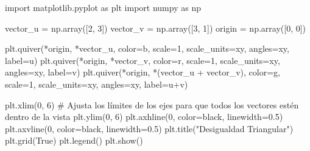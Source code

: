 \documentclass[
  letterpaper,
  DIV=11,
  numbers=noendperiod]{scrartcl}
\newenvironment{Shaded}{\begin{snugshade}}{\end{snugshade}}
\newcommand{\CommentTok}[1]{\textcolor[rgb]{0.37,0.37,0.37}{#1}}
\newcommand{\DecValTok}[1]{\textcolor[rgb]{0.68,0.00,0.00}{#1}}
\newcommand{\FloatTok}[1]{\textcolor[rgb]{0.68,0.00,0.00}{#1}}
\newcommand{\ImportTok}[1]{\textcolor[rgb]{0.00,0.46,0.62}{#1}}
\newcommand{\NormalTok}[1]{\textcolor[rgb]{0.00,0.23,0.31}{#1}}
\newcommand{\OperatorTok}[1]{\textcolor[rgb]{0.37,0.37,0.37}{#1}}
\newcommand{\StringTok}[1]{\textcolor[rgb]{0.13,0.47,0.30}{#1}}
\newcommand{\VariableTok}[1]{\textcolor[rgb]{0.07,0.07,0.07}{#1}}
\begin{document}
\begin{Shaded}
\begin{Highlighting}[]
\ImportTok{import}\NormalTok{ matplotlib.pyplot }\ImportTok{as}\NormalTok{ plt}
\ImportTok{import}\NormalTok{ numpy }\ImportTok{as}\NormalTok{ np}

\NormalTok{vector\_u }\OperatorTok{=}\NormalTok{ np.array([}\DecValTok{2}\NormalTok{, }\DecValTok{3}\NormalTok{])}
\NormalTok{vector\_v }\OperatorTok{=}\NormalTok{ np.array([}\DecValTok{3}\NormalTok{, }\DecValTok{1}\NormalTok{])}
\NormalTok{origin }\OperatorTok{=}\NormalTok{ np.array([}\DecValTok{0}\NormalTok{, }\DecValTok{0}\NormalTok{])}

\NormalTok{plt.quiver(}\OperatorTok{*}\NormalTok{origin, }\OperatorTok{*}\NormalTok{vector\_u, color}\OperatorTok{=}\StringTok{\textquotesingle{}b\textquotesingle{}}\NormalTok{, scale}\OperatorTok{=}\DecValTok{1}\NormalTok{, scale\_units}\OperatorTok{=}\StringTok{\textquotesingle{}xy\textquotesingle{}}\NormalTok{, angles}\OperatorTok{=}\StringTok{\textquotesingle{}xy\textquotesingle{}}\NormalTok{, label}\OperatorTok{=}\StringTok{\textquotesingle{}u\textquotesingle{}}\NormalTok{)}
\NormalTok{plt.quiver(}\OperatorTok{*}\NormalTok{origin, }\OperatorTok{*}\NormalTok{vector\_v, color}\OperatorTok{=}\StringTok{\textquotesingle{}r\textquotesingle{}}\NormalTok{, scale}\OperatorTok{=}\DecValTok{1}\NormalTok{, scale\_units}\OperatorTok{=}\StringTok{\textquotesingle{}xy\textquotesingle{}}\NormalTok{, angles}\OperatorTok{=}\StringTok{\textquotesingle{}xy\textquotesingle{}}\NormalTok{, label}\OperatorTok{=}\StringTok{\textquotesingle{}v\textquotesingle{}}\NormalTok{)}
\NormalTok{plt.quiver(}\OperatorTok{*}\NormalTok{origin, }\OperatorTok{*}\NormalTok{(vector\_u }\OperatorTok{+}\NormalTok{ vector\_v), color}\OperatorTok{=}\StringTok{\textquotesingle{}g\textquotesingle{}}\NormalTok{, scale}\OperatorTok{=}\DecValTok{1}\NormalTok{, scale\_units}\OperatorTok{=}\StringTok{\textquotesingle{}xy\textquotesingle{}}\NormalTok{, angles}\OperatorTok{=}\StringTok{\textquotesingle{}xy\textquotesingle{}}\NormalTok{, label}\OperatorTok{=}\StringTok{\textquotesingle{}u+v\textquotesingle{}}\NormalTok{)}

\NormalTok{plt.xlim(}\DecValTok{0}\NormalTok{, }\DecValTok{6}\NormalTok{)  }\CommentTok{\# Ajusta los límites de los ejes para que todos los vectores estén dentro de la vista}
\NormalTok{plt.ylim(}\DecValTok{0}\NormalTok{, }\DecValTok{6}\NormalTok{)}
\NormalTok{plt.axhline(}\DecValTok{0}\NormalTok{, color}\OperatorTok{=}\StringTok{\textquotesingle{}black\textquotesingle{}}\NormalTok{, linewidth}\OperatorTok{=}\FloatTok{0.5}\NormalTok{)}
\NormalTok{plt.axvline(}\DecValTok{0}\NormalTok{, color}\OperatorTok{=}\StringTok{\textquotesingle{}black\textquotesingle{}}\NormalTok{, linewidth}\OperatorTok{=}\FloatTok{0.5}\NormalTok{)}
\NormalTok{plt.title(}\StringTok{"Desigualdad Triangular"}\NormalTok{)}
\NormalTok{plt.grid(}\VariableTok{True}\NormalTok{)}
\NormalTok{plt.legend()}
\NormalTok{plt.show()}
\end{Highlighting}
\end{Shaded}
\end{document}
